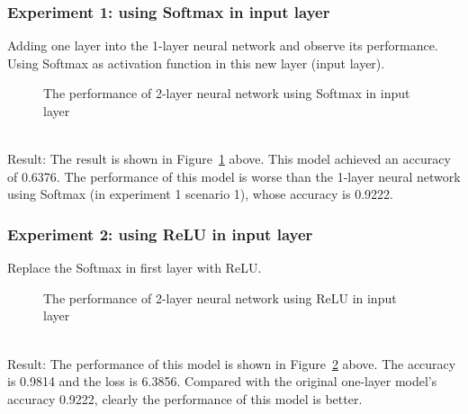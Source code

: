 \documentclass[]{UCD_CS_FYP_Report}
\begin{document}
\subsubsection{Experiment 1: using Softmax in input layer}
Adding one layer into the 1-layer neural network and observe its performance. Using Softmax as activation function in this new layer (input layer).
\begin{figure}[h]
\centering
\fboxsep 2mm
\caption{\label{fig:MNIST_fully_coneected_S2E1} The performance of 2-layer neural network using Softmax in input layer}
\end{figure}
\\Result: The result is shown in Figure~\ref{fig:MNIST_fully_coneected_S2E1} above. This model achieved an accuracy of 0.6376. The performance of this model is worse than the 1-layer neural network using Softmax (in experiment 1 scenario 1), whose accuracy is 0.9222.
%
\subsubsection{Experiment 2: using ReLU in input layer}
Replace the Softmax in first layer with ReLU.
\begin{figure}[h]
\centering
\fboxsep 2mm
\caption{\label{fig:MNIST_fully_coneected_S2E2} The performance of 2-layer neural network using ReLU in input layer}
\end{figure}
\\Result: The performance of this model is shown in Figure~\ref{fig:MNIST_fully_coneected_S2E2} above. The accuracy is 0.9814 and the loss is 6.3856. Compared with the original one-layer model’s accuracy 0.9222, clearly the performance of this model is better.
%
\end{document}
